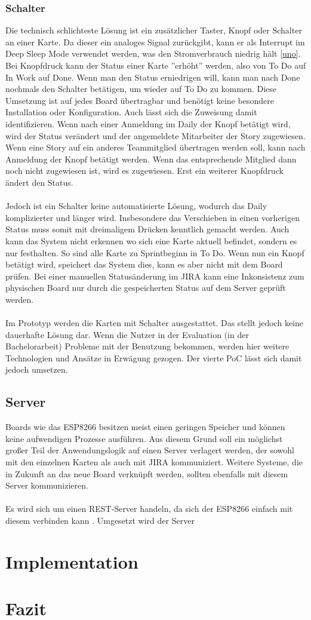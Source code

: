 \documentclass[12pt,titlepage]{scrartcl}
\begin{document}
			\subsubsection{Schalter}
			Die technisch schlichteste Lösung ist ein zusätzlicher Taster, Knopf oder Schalter an einer Karte. Da dieser ein analoges Signal zurückgibt, kann er als Interrupt im Deep Sleep Mode verwendet werden, was den Stromverbrauch niedrig hält \ref{uno}. Bei Knopfdruck kann der Status einer Karte ''erhöht'' werden, also von To Do auf In Work auf Done.  Wenn man den Status erniedrigen will, kann man nach Done nochmals den Schalter betätigen, um wieder auf To Do zu kommen. Diese Umsetzung ist auf jedes Board übertragbar und benötigt keine besondere Installation oder Konfiguration. Auch lässt sich die Zuweisung damit identifizieren. Wenn nach einer Anmeldung im Daily der Knopf betätigt wird, wird der Status verändert und der angemeldete Mitarbeiter der Story zugewiesen. Wenn eine Story auf ein anderes Teammitglied übertragen werden soll, kann nach Anmeldung der Knopf betätigt werden. Wenn das entsprechende Mitglied dann noch nicht zugewiesen ist, wird es zugewiesen. Erst ein weiterer Knopfdruck ändert den Status. \\ \\
Jedoch ist ein Schalter keine automatisierte Lösung, wodurch das Daily komplizierter und länger wird. Insbesondere das Verschieben in einen vorherigen Status muss somit mit dreimaligem Drücken kenntlich gemacht werden. Auch kann das System nicht erkennen wo sich eine Karte aktuell befindet, sondern es nur festhalten. So sind alle Karte zu Sprintbeginn in To Do. Wenn nun ein Knopf betätigt wird, speichert das System dies, kann es aber nicht mit dem Board prüfen. Bei einer manuellen Statusänderung im JIRA kann eine Inkonsistenz zum physischen Board nur durch die gespeicherten Status auf dem Server geprüft werden. \\ \\
Im Prototyp werden die Karten mit Schalter ausgestattet. Das stellt jedoch keine dauerhafte Lösung dar. Wenn die Nutzer in der Evaluation (in der Bachelorarbeit) Probleme mit der Benutzung bekommen, werden hier weitere Technologien und Ansätze in Erwägung gezogen. Der vierte PoC lässt sich damit jedoch umsetzen.
		\subsection{Server}
		Boards wie das ESP8266 besitzen meist einen geringen Speicher und können keine aufwendigen Prozesse ausführen. Aus diesem Grund soll ein möglichst großer Teil der Anwendungslogik auf einen Server verlagert werden, der sowohl mit den einzelnen Karten als auch mit JIRA kommuniziert. Weitere Systeme, die in Zukunft an das neue Board verknüpft werden, sollten ebenfalls mit diesem Server kommunizieren. \\ \\
		Es wird sich um einen REST-Server handeln, da sich der ESP8266 einfach mit diesem verbinden kann \cite{nodemcuexamples}. Umgesetzt wird der Server 
	\newpage
	\section{Implementation}
	\newpage	
	\section{Fazit}
	\newpage

	

 	
\end{document}
